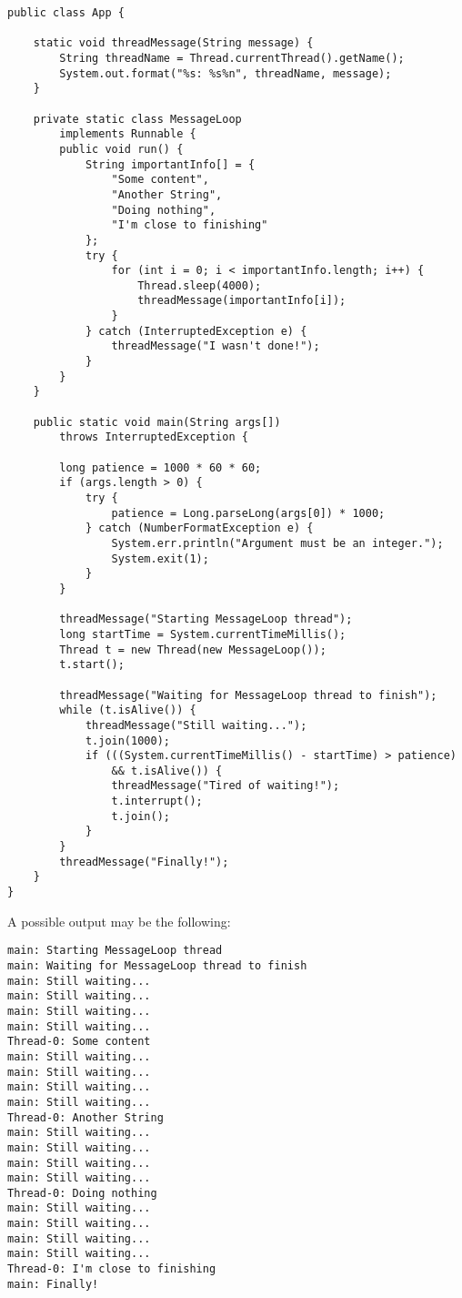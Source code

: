 \documentclass{latex/classes/myarticle}
\begin{document}
\begin{lstlisting}
public class App {

    static void threadMessage(String message) {
        String threadName = Thread.currentThread().getName();
        System.out.format("%s: %s%n", threadName, message);
    }

    private static class MessageLoop
        implements Runnable {
        public void run() {
            String importantInfo[] = {
                "Some content",
                "Another String",
                "Doing nothing",
                "I'm close to finishing"
            };
            try {
                for (int i = 0; i < importantInfo.length; i++) {
                    Thread.sleep(4000);
                    threadMessage(importantInfo[i]);
                }
            } catch (InterruptedException e) {
                threadMessage("I wasn't done!");
            }
        }
    }

    public static void main(String args[])
        throws InterruptedException {

        long patience = 1000 * 60 * 60;
        if (args.length > 0) {
            try {
                patience = Long.parseLong(args[0]) * 1000;
            } catch (NumberFormatException e) {
                System.err.println("Argument must be an integer.");
                System.exit(1);
            }
        }

        threadMessage("Starting MessageLoop thread");
        long startTime = System.currentTimeMillis();
        Thread t = new Thread(new MessageLoop());
        t.start();

        threadMessage("Waiting for MessageLoop thread to finish");
        while (t.isAlive()) {
            threadMessage("Still waiting...");
            t.join(1000);
            if (((System.currentTimeMillis() - startTime) > patience)
                && t.isAlive()) {
                threadMessage("Tired of waiting!");
                t.interrupt();
                t.join();
            }
        }
        threadMessage("Finally!");
    }
}
\end{lstlisting}

A possible output may be the following:

\begin{verbatim}
main: Starting MessageLoop thread
main: Waiting for MessageLoop thread to finish
main: Still waiting...
main: Still waiting...
main: Still waiting...
main: Still waiting...
Thread-0: Some content
main: Still waiting...
main: Still waiting...
main: Still waiting...
main: Still waiting...
Thread-0: Another String
main: Still waiting...
main: Still waiting...
main: Still waiting...
main: Still waiting...
Thread-0: Doing nothing
main: Still waiting...
main: Still waiting...
main: Still waiting...
main: Still waiting...
Thread-0: I'm close to finishing
main: Finally!
\end{verbatim}
\end{document}
